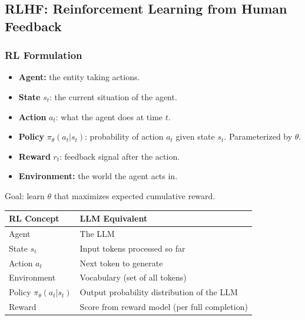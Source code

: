 \documentclass[11pt, a4paper]{article}
\begin{document}
\subsection{RLHF: Reinforcement Learning from Human Feedback}

\subsubsection{RL Formulation}

\begin{defbox}[RL Basics]
\begin{itemize}[leftmargin=1.5em]
  \item \textbf{Agent:} the entity taking actions.
  \item \textbf{State} $s_t$: the current situation of the agent.
  \item \textbf{Action} $a_t$: what the agent does at time $t$.
  \item \textbf{Policy} $\pi_\theta(a_t | s_t)$: probability of action $a_t$ given state $s_t$. Parameterized by $\theta$.
  \item \textbf{Reward} $r_t$: feedback signal after the action.
  \item \textbf{Environment:} the world the agent acts in.
\end{itemize}
Goal: learn $\theta$ that maximizes expected cumulative reward.
\end{defbox}

\begin{defbox}
\begin{center}
\begin{tabular}{@{}ll@{}}
\toprule
\textbf{RL Concept} & \textbf{LLM Equivalent} \\
\midrule
Agent & The LLM \\
State $s_t$ & Input tokens processed so far \\
Action $a_t$ & Next token to generate \\
Environment & Vocabulary (set of all tokens) \\
Policy $\pi_\theta(a_t | s_t)$ & Output probability distribution of the LLM \\
Reward & Score from reward model (per full completion) \\
\bottomrule
\end{tabular}
\end{center}
\end{defbox}
\end{document}
